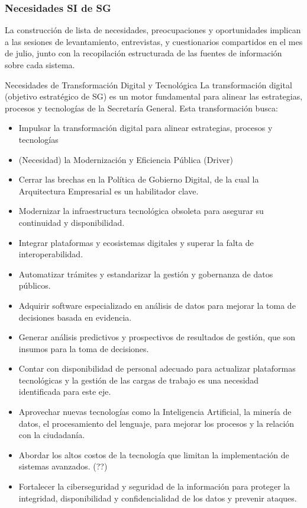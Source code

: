 \documentclass[
	a4paper, %
	12pt, %
]{include/CSSullivanBusinessReport}
\begin{document}
\subsubsection{Necesidades SI de SG}\label{sec:necesidades-si-de-sg}

La construcción de lista de necesidades, preocupaciones y oportunidades
implican a las sesiones de levantamiento, entrevistas, y cuestionarios
compartidos en el mes de julio, junto con la recopilación estructurada
de las fuentes de información sobre cada sistema.

Necesidades de Transformación Digital y Tecnológica La transformación
digital (objetivo estratégico de SG) es un motor fundamental para
alinear las estrategias, procesos y tecnologías de la Secretaría
General. Esta transformación busca:

\begin{itemize}
\item
  Impulsar la transformación digital para alinear estrategias, procesos
  y tecnologías
\item
  (Necesidad) la Modernización y Eficiencia Pública (Driver)
\item
  Cerrar las brechas en la Política de Gobierno Digital, de la cual la
  Arquitectura Empresarial es un habilitador clave.
\item
  Modernizar la infraestructura tecnológica obsoleta para asegurar su
  continuidad y disponibilidad.
\item
  Integrar plataformas y ecosistemas digitales y superar la falta de
  interoperabilidad.
\item
  Automatizar trámites y estandarizar la gestión y gobernanza de datos
  públicos.
\item
  Adquirir software especializado en análisis de datos para mejorar la
  toma de decisiones basada en evidencia.
\item
  Generar análisis predictivos y prospectivos de resultados de gestión,
  que son insumos para la toma de decisiones.
\item
  Contar con disponibilidad de personal adecuado para actualizar
  plataformas tecnológicas y la gestión de las cargas de trabajo es una
  necesidad identificada para este eje.
\item
  Aprovechar nuevas tecnologías como la Inteligencia Artificial, la
  minería de datos, el procesamiento del lenguaje, para mejorar los
  procesos y la relación con la ciudadanía.
\item
  Abordar los altos costos de la tecnología que limitan la
  implementación de sistemas avanzados. (??)
\item
  Fortalecer la ciberseguridad y seguridad de la información para
  proteger la integridad, disponibilidad y confidencialidad de los datos
  y prevenir ataques.
\end{itemize}
\end{document}
